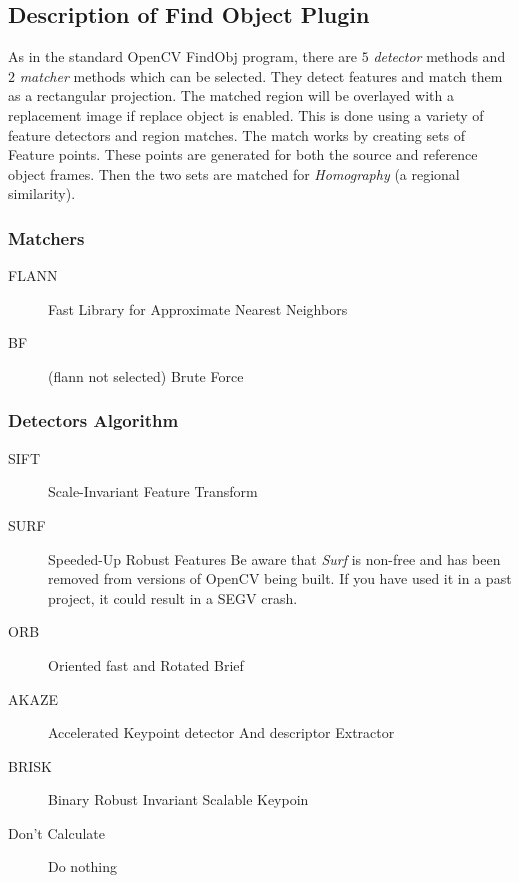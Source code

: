 \subsection{Description of Find Object Plugin}%
\label{sub:description_findobj_plugin}

As in the standard OpenCV FindObj program, there are $5$ \textit{detector} methods and $2$ \textit{matcher} methods which can be selected. They detect features and match them as a rectangular projection. The matched region will be overlayed with a replacement image if replace object is enabled. This is done using a variety of feature detectors and region matches. The match works by creating sets of Feature points. These points are generated for both the source and reference object frames. Then the two sets are matched for \textit{Homography} (a regional similarity).

\subsubsection*{Matchers}%
\label{ssub:matchers}

\begin{description}
    \item[FLANN] Fast Library for Approximate Nearest Neighbors
    \item[BF] (flann not selected) Brute Force
\end{description}

\subsubsection*{Detectors Algorithm}%
\label{ssub:detectors_algorithm}

\begin{description}
    \item[SIFT] Scale-Invariant Feature Transform
    \item[SURF] Speeded-Up Robust Features
 Be aware that \textit{Surf} is non-free and has been removed from versions of OpenCV being built.
 If you have used it in a past project, it could result in a SEGV crash.
    \item[ORB] Oriented fast and Rotated Brief
    \item[AKAZE] Accelerated Keypoint detector And descriptor Extractor
    \item[BRISK] Binary Robust Invariant Scalable Keypoin
    \item [Don’t Calculate] Do nothing
\end{description}

